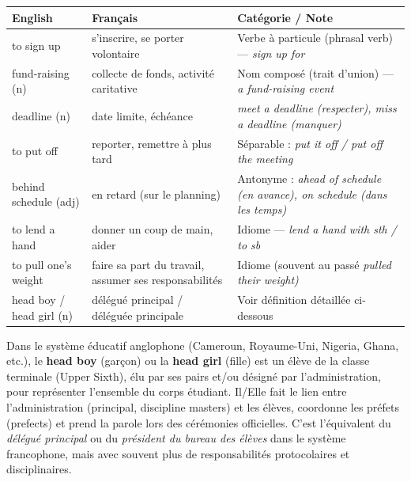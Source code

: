\documentclass[11pt]{article}
\newcommand{\eng}[1]{\ifmmode\text{\textit{#1}}\else\begingroup\selectlanguage{english}\itshape #1\endgroup\fi}
\begin{document}
\begin{definition}
\begin{center}
\begin{tabularx}{\linewidth}{|X|X|X|}
\hline
\rowcolor{popblueL} \textbf{English} & \textbf{Français} & \textbf{Catégorie / Note} \\
\hline
to sign up & s'inscrire, se porter volontaire & Verbe à particule (phrasal verb) — \eng{sign up for} \\
\hline
fund-raising (n) & collecte de fonds, activité caritative & Nom composé (trait d'union) — \eng{a fund-raising event} \\
\hline
deadline (n) & date limite, échéance & \eng{meet a deadline} (respecter), \eng{miss a deadline} (manquer) \\
\hline
to put off & reporter, remettre à plus tard & Séparable : \eng{put it off} / \eng{put off the meeting} \\
\hline
behind schedule (adj) & en retard (sur le planning) & Antonyme : \eng{ahead of schedule} (en avance), \eng{on schedule} (dans les temps) \\
\hline
to lend a hand & donner un coup de main, aider & Idiome — \eng{lend a hand with sth / to sb} \\
\hline
to pull one's weight & faire sa part du travail, assumer ses responsabilités & Idiome (souvent au passé \eng{pulled their weight}) \\
\hline
head boy / head girl (n) & délégué principal / déléguée principale & Voir définition détaillée ci-dessous \\
\hline
\end{tabularx}
\end{center}
\end{definition}

\begin{definition}
Dans le système éducatif anglophone (Cameroun, Royaume-Uni, Nigeria, Ghana, etc.), le \textbf{head boy} (garçon) ou la \textbf{head girl} (fille) est un élève de la classe terminale (Upper Sixth), élu par ses pairs et/ou désigné par l'administration, pour représenter l'ensemble du corps étudiant. Il/Elle fait le lien entre l'administration (principal, discipline masters) et les élèves, coordonne les préfets (prefects) et prend la parole lors des cérémonies officielles. C'est l'équivalent du \emph{délégué principal} ou du \emph{président du bureau des élèves} dans le système francophone, mais avec souvent plus de responsabilités protocolaires et disciplinaires.
\end{definition}
\end{document}
